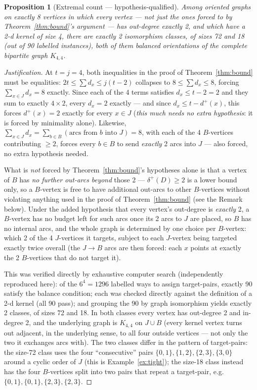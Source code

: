 \documentclass[11pt]{article}
\theoremstyle{plain}
\newtheorem{proposition}[theorem]{Proposition}
\theoremstyle{definition}
\theoremstyle{remark}
\begin{document}
\begin{proposition}[Extremal count — hypothesis-qualified]
\label{prop:count}
Among oriented graphs on exactly 8 vertices in which \emph{every} vertex — not just
the ones forced to by Theorem~\ref{thm:bound}'s argument — has out-degree
\emph{exactly} 2, and which have a 2-d kernel of size 4, there are exactly 2
isomorphism classes, of sizes 72 and 18 (out of 90 labelled instances), both of them
balanced orientations of the complete bipartite graph $K_{4,4}$.
\end{proposition}

\begin{proof}[Justification]
At $t=j=4$, both inequalities in the proof of Theorem~\ref{thm:bound} must be
equalities: $2t \le \sum d_x \le j(t-2)$ collapses to $8 \le \sum d_x \le 8$, forcing
$\sum_{x\in J} d_x = 8$ exactly. Since each of the 4 terms satisfies $d_x \le t-2=2$
and they sum to exactly $4\times 2$, every $d_x = 2$ exactly — and since
$d_x \le t - d^+(x)$, this forces $d^+(x) = 2$ exactly for every $x \in J$
(\emph{this much needs no extra hypothesis}: it is forced by minimality alone).
Likewise, $\sum_{x\in J} d_x = \sum_{b \in B}(\text{arcs from $b$ into $J$}) = 8$,
with each of the 4 $B$-vertices contributing $\ge 2$, forces every $b \in B$ to send
\emph{exactly} 2 arcs into $J$ — also forced, no extra hypothesis needed.

What is \emph{not} forced by Theorem~\ref{thm:bound}'s hypotheses alone is that a
vertex of $B$ has \emph{no further out-arcs beyond} those 2 — $\delta^+(D)\ge2$ is a
lower bound only, so a $B$-vertex is free to have additional out-arcs to other
$B$-vertices without violating anything used in the proof of Theorem~\ref{thm:bound}
(see the Remark below). Under the added hypothesis that every vertex's out-degree is
\emph{exactly} 2, a $B$-vertex has no budget left for such arcs once its 2 arcs to
$J$ are placed, so $B$ has no internal arcs, and the whole graph is determined by one
choice per $B$-vertex: which 2 of the 4 $J$-vertices it targets, subject to each
$J$-vertex being targeted exactly twice overall (the $J\to B$ arcs are then forced:
each $x$ points at exactly the 2 $B$-vertices that do not target it).

This was verified directly by exhaustive computer search (independently reproduced
here): of the $6^4 = 1296$ labelled ways to assign target-pairs, exactly 90 satisfy
the balance condition; each was checked directly against the definition of a
2-d kernel (all 90 pass); and grouping the 90 by graph isomorphism yields exactly 2
classes, of sizes 72 and 18. In both classes every vertex has out-degree 2 and
in-degree 2, and the underlying graph is $K_{4,4}$ on $J \cup B$ (every kernel vertex
turns out adjacent, in the underlying sense, to all four outside vertices — not only
the two it exchanges arcs with). The two classes differ in the pattern of
target-pairs: the size-72 class uses the four ``consecutive'' pairs
$\{0,1\},\{1,2\},\{2,3\},\{3,0\}$ around a cyclic order of $J$ (this is
Example~\ref{ex:tight}); the size-18 class instead has the four $B$-vertices split
into two pairs that repeat a target-pair, e.g.\ $\{0,1\},\{0,1\},\{2,3\},\{2,3\}$.
\end{proof}
\end{document}
